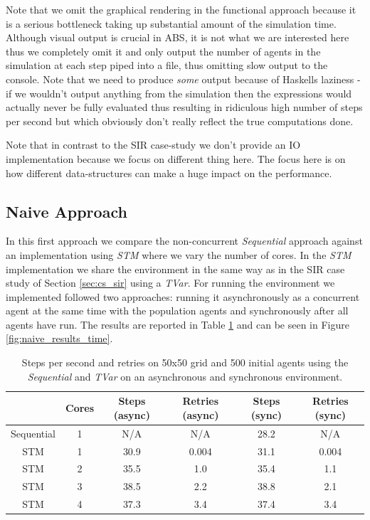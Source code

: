 Note that we omit the graphical rendering in the functional approach because it is a serious bottleneck taking up substantial amount of the simulation time. Although visual output is crucial in ABS, it is not what we are interested here thus we completely omit it and only output the number of agents in the simulation at each step piped into a file, thus omitting slow output to the console. Note that we need to produce \textit{some} output because of Haskells laziness - if we wouldn't output anything from the simulation then the expressions would actually never be fully evaluated thus resulting in ridiculous high number of steps per second but which obviously don't really reflect the true computations done.

Note that in contrast to the SIR case-study we don't provide an IO implementation because we focus on different thing here. The focus here is on how different data-structures can make a huge impact on the performance.

\subsection{Naive Approach}
In this first approach we compare the non-concurrent \textit{Sequential} approach against an implementation using \textit{STM} where we vary the number of cores. In the \textit{STM} implementation we share the environment in the same way as in the SIR case study of Section \ref{sec:cs_sir} using a \textit{TVar}. For running the environment we implemented followed two approaches: running it asynchronously as a concurrent agent at the same time with the population agents and synchronously after all agents have run. The results are reported in Table \ref{tab:naive_results_time} and can be seen in Figure \ref{fig:naive_results_time}. 

\begin{table}
	\centering
  	\begin{tabular}{ c || c | c | c || c | c }
                   & Cores & Steps (async) & Retries (async) & Steps (sync) & Retries (sync) \\ \hline \hline 
    	Sequential & 1     & N/A           & N/A 			 & 28.2         & N/A            \\ \hline \hline    
   		STM        & 1     & 30.9          & 0.004 			 & 31.1 	    & 0.004          \\ \hline
   		STM        & 2     & 35.5          & 1.0 		     & 35.4         & 1.1 			 \\ \hline
   		STM        & 3     & 38.5          & 2.2 			 & 38.8 	    & 2.1 			 \\ \hline
   		STM        & 4     & 37.3          & 3.4             & 37.4         & 3.4
   	\end{tabular}
  	
  	\caption{Steps per second and retries on 50x50 grid and 500 initial agents using the \textit{Sequential} and \textit{TVar} on an asynchronous and synchronous environment.}
	\label{tab:naive_results_time}
\end{table}


